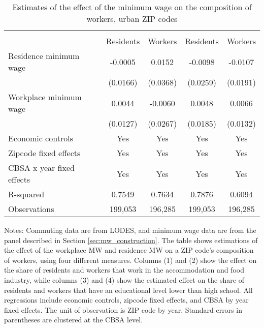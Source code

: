 \begin{table}[hbt!] \centering
    \caption{Estimates of the effect of the minimum wage on the composition of workers, urban ZIP codes}
    \label{tab:share_migration}
    \begin{tabular}{lcccc}
        \toprule 
        &  &  \\ \cmidrule(lr){2-3} \cmidrule(lr){4-5}
                    & Residents & Workers & Residents & Workers \\  \midrule
        Residence minimum wage &  -0.0005  &  0.0152  &  -0.0098  &  -0.0107  \\
                               & (0.0166) & (0.0368) & (0.0259) & (0.0191) \\
        Workplace minimum wage &  0.0044  &  -0.0060  &  0.0048  &  0.0066  \\
                               & (0.0127) & (0.0267) & (0.0185) & (0.0132) \\  \midrule
        Economic controls           &  Yes   &  Yes   &  Yes  &  Yes  \\
        Zipcode fixed effects       &  Yes   &  Yes   &  Yes  &  Yes  \\
        CBSA x year fixed effects   &  Yes   &  Yes   &  Yes  &  Yes  \\
        R-squared                   &  0.7549   &  0.7634   &  0.7876  &  0.6094  \\
        Observations                &  199,053  &  196,285  &  199,053 &  196,285  
        \\\bottomrule
    \end{tabular}
    
    \begin{minipage}{.95\textwidth} \footnotesize
        \vspace{2mm}
        Notes:
        Commuting data are from LODES, and minimum wage 
        data are from the panel described in Section \ref{sec:mw_construction}.
        The table shows estimations of the effect of the workplace MW and
        residence MW on a ZIP code's composition of workers, using four different measures. Columns (1) and (2) show the effect on the share of residents and workers that work in the accommodation and food industry, while columns (3) and (4) show the estimated effect on the share of residents and workers that have an educational level lower than high school. 
        All regressions include economic controls, zipcode fixed effects, and CBSA by year fixed effects.
        The unit of observation is ZIP code by year.
        Standard errors in parentheses are clustered at the CBSA level.
    \end{minipage}
\end{table}
